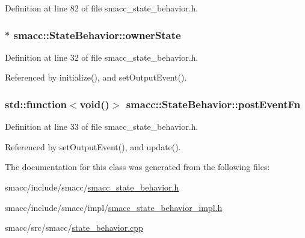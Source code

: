Definition at line 82 of file smacc\+\_\+state\+\_\+behavior.\+h.

\subsubsection[{\texorpdfstring{owner\+State}{ownerState}}]{$\ast$ smacc\+::\+State\+Behavior\+::owner\+State}\hypertarget{classsmacc_1_1StateBehavior_abdc8c883baf520fd01f98e046d045dca}{}\label{classsmacc_1_1StateBehavior_abdc8c883baf520fd01f98e046d045dca}


Definition at line 32 of file smacc\+\_\+state\+\_\+behavior.\+h.



Referenced by initialize(), and set\+Output\+Event().

\subsubsection[{\texorpdfstring{post\+Event\+Fn}{postEventFn}}]{\setlength{\rightskip}{0pt plus 5cm}std\+::function$<$void()$>$ smacc\+::\+State\+Behavior\+::post\+Event\+Fn}\hypertarget{classsmacc_1_1StateBehavior_aa8485f8a68716ca9429ac8e72e057b7c}{}\label{classsmacc_1_1StateBehavior_aa8485f8a68716ca9429ac8e72e057b7c}


Definition at line 33 of file smacc\+\_\+state\+\_\+behavior.\+h.



Referenced by set\+Output\+Event(), and update().



The documentation for this class was generated from the following files\+:\begin{DoxyCompactItemize}
\item 
smacc/include/smacc/\hyperlink{smacc__state__behavior_8h}{smacc\+\_\+state\+\_\+behavior.\+h}\item 
smacc/include/smacc/impl/\hyperlink{smacc__state__behavior__impl_8h}{smacc\+\_\+state\+\_\+behavior\+\_\+impl.\+h}\item 
smacc/src/smacc/\hyperlink{state__behavior_8cpp}{state\+\_\+behavior.\+cpp}\end{DoxyCompactItemize}
